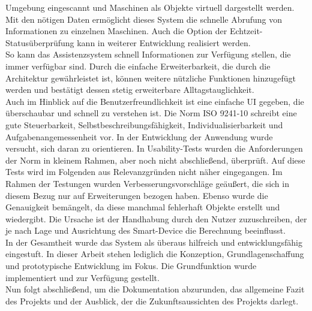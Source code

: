 Umgebung eingescannt und Maschinen als Objekte virtuell dargestellt werden. Mit den nötigen Daten ermöglicht dieses System die schnelle Abrufung von Informationen 
zu einzelnen Maschinen. Auch die Option der Echtzeit-Statusüberprüfung kann in weiterer Entwicklung realisiert werden. 
\\ 
So kann das Assistenzsystem schnell Informationen zur Verfügung stellen, die immer verfügbar sind. Durch die einfache Erweiterbarkeit, die 
durch die Architektur gewährleistet ist, können weitere nützliche Funktionen hinzugefügt werden und bestätigt dessen stetig erweiterbare Alltagstauglichkeit.
\\ 
Auch im Hinblick auf die Benutzerfreundlichkeit ist eine einfache \acs{UI} gegeben, die überschaubar und schnell zu verstehen ist. Die Norm ISO 9241-10 schreibt eine gute 
Steuerbarkeit, Selbstbeschreibungsfähigkeit, Individualisierbarkeit und Aufgabenangemessenheit vor. In der Entwicklung der Anwendung wurde versucht, sich daran zu orientieren. 
In Usability-Tests wurden die Anforderungen der Norm in kleinem Rahmen, aber noch nicht abschließend, überprüft. Auf diese Tests wird im Folgenden aus Relevanzgründen nicht 
näher eingegangen. Im Rahmen der Testungen wurden 
Verbesserungsvorschläge geäußert, die sich in diesem Bezug nur auf Erweiterungen bezogen haben. Ebenso wurde die Genauigkeit bemängelt, da 
diese manchmal fehlerhaft Objekte erstellt und wiedergibt. Die Ursache ist der Handhabung durch den Nutzer zuzuschreiben, der je nach Lage und Ausrichtung des Smart-Device 
die Berechnung beeinflusst. 
\\ 
In der Gesamtheit wurde das System als überaus hilfreich und entwicklungsfähig eingestuft. In dieser Arbeit stehen lediglich die Konzeption, 
Grundlagenschaffung und prototypische Entwicklung im Fokus. Die Grundfunktion wurde implementiert und zur Verfügung gestellt.
\\ 
\linebreak
Nun folgt abschließend, um die Dokumentation abzurunden, das allgemeine Fazit des Projekts und der Ausblick, der die Zukunftsaussichten des Projekts darlegt. 
